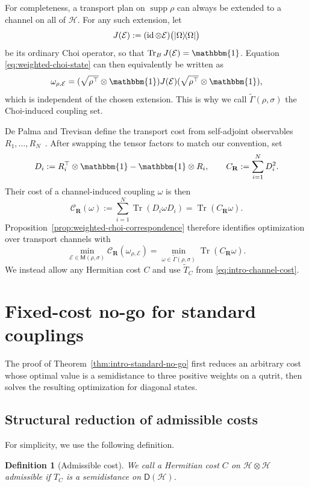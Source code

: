 \documentclass[11pt]{article}
\newtheorem{definition}{Definition}[section]
\newcommand{\ketbra}[2]{\ensuremath{\ket{#1}\!\bra{#2}}}
\newcommand{\Dens}{\mathsf{D}}
\newcommand{\Id}{\mathbbm{1}}
\DeclarePairedDelimiter\ket{\lvert}{\rangle}
\DeclarePairedDelimiter\bra{\langle}{\rvert}
\newcommand{\calE}{\mathcal{E}}
\newcommand{\calH}{\mathcal{H}}
\begin{document}
For completeness, a transport plan on $\operatorname{supp}\rho$ can always
be extended to a channel on all of $\calH$.  For any such extension, let
\[
    J(\calE):=(\operatorname{id}\otimes\calE)
    \bigl(\ketbra{\Omega}{\Omega}\bigr)
\]
be its ordinary Choi operator, so that
$\operatorname{Tr}_B J(\calE)=\Id$.  Equation
\eqref{eq:weighted-choi-state} can then equivalently be written as
\begin{equation}\label{eq:weighted-choi-operator}
    \omega_{\rho,\calE}
    =
    (\sqrt{\rho^{\top}}\otimes\Id)
    J(\calE)
    (\sqrt{\rho^{\top}}\otimes\Id),
\end{equation}
which is independent of the chosen extension.  This is why we call
$\widetilde\Gamma(\rho,\sigma)$ the Choi-induced coupling set.

De Palma and Trevisan define the transport cost from self-adjoint observables
$R_1,\ldots,R_N$~\cite[Definition~5 and Eq.~(32)]{DT21}.  After swapping the
tensor factors to match our convention, set
\[
    D_i:=R_i^{\top}\otimes\Id-\Id\otimes R_i,
    \qquad
    C_{\mathbf R}:=\sum_{i=1}^N D_i^2.
\]
Their cost of a channel-induced coupling $\omega$ is then
\[
    \mathcal{C}_{\mathbf R}(\omega)
    :=\sum_{i=1}^N\operatorname{Tr}(D_i\omega D_i)
    =\operatorname{Tr}(C_{\mathbf R}\omega).
\]
Proposition~\ref{prop:weighted-choi-correspondence} therefore identifies
optimization over transport channels with
\[
    \min_{\calE\in\mathsf{M}(\rho,\sigma)}
    \mathcal{C}_{\mathbf R}(\omega_{\rho,\calE})
    =
    \min_{\omega\in\widetilde\Gamma(\rho,\sigma)}
    \operatorname{Tr}(C_{\mathbf R}\omega).
\]
We instead allow any Hermitian cost $C$ and use $\widetilde T_C$ from
\eqref{eq:intro-channel-cost}.

\section{Fixed-cost no-go for standard couplings}
\label{sec:standard-no-go}

The proof of Theorem~\ref{thm:intro-standard-no-go} first reduces an
arbitrary cost whose optimal value is a semidistance to three positive
weights on a qutrit, then solves the resulting optimization for diagonal
states.

\subsection{Structural reduction of admissible costs}

For simplicity, we use the following definition.
\begin{definition}[Admissible cost]\label{def:admissible-cost}
    We call a Hermitian cost $C$ on $\calH\otimes\calH$ admissible if $T_C$
    is a semidistance on $\Dens(\calH)$.
\end{definition}
\end{document}
